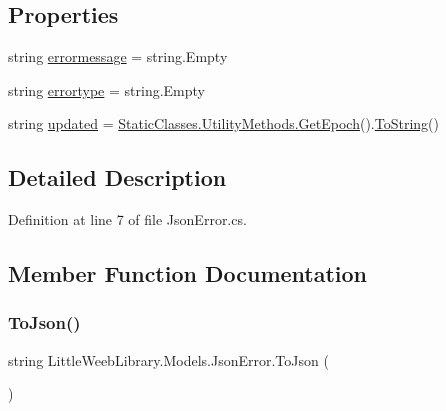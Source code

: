 \subsection*{Properties}
\begin{DoxyCompactItemize}
\item 
string \mbox{\hyperlink{class_little_weeb_library_1_1_models_1_1_json_error_ac9cf92432e69f00b21e72d9f65f3d002}{errormessage}} = string.\+Empty
\item 
string \mbox{\hyperlink{class_little_weeb_library_1_1_models_1_1_json_error_a039812aa232bfc76582f0998b5937569}{errortype}} = string.\+Empty
\item 
string \mbox{\hyperlink{class_little_weeb_library_1_1_models_1_1_json_error_a31f1c85212ed62b97dc71b389e251cee}{updated}} = \mbox{\hyperlink{class_little_weeb_library_1_1_static_classes_1_1_utility_methods_a12336d9e64983ddabaad8950486fafb2}{Static\+Classes.\+Utility\+Methods.\+Get\+Epoch}}().\mbox{\hyperlink{class_little_weeb_library_1_1_models_1_1_json_error_ad7d5522c90119111d2e929f39e7f6d3c}{To\+String}}()
\end{DoxyCompactItemize}


\subsection{Detailed Description}


Definition at line 7 of file Json\+Error.\+cs.



\subsection{Member Function Documentation}
\mbox{\label{class_little_weeb_library_1_1_models_1_1_json_error_a0e3e7dd2e2990404b7f0461742b23440}} 
\subsubsection{\texorpdfstring{To\+Json()}{ToJson()}}
{\footnotesize\ttfamily string Little\+Weeb\+Library.\+Models.\+Json\+Error.\+To\+Json (\begin{DoxyParamCaption}{ }\end{DoxyParamCaption})}




